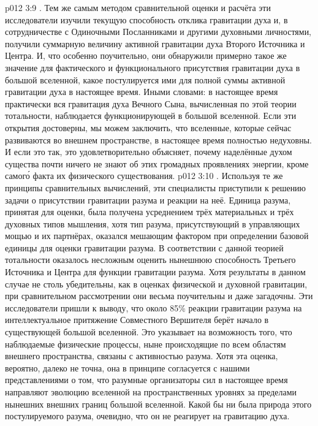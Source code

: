 \vs p012 3:9 . Тем же самым методом сравнительной оценки и расчёта эти исследователи изучили текущую способность отклика гравитации духа и, в сотрудничестве с Одиночными Посланниками и другими духовными личностями, получили суммарную величину активной гравитации духа Второго Источника и Центра. И, что особенно поучительно, они обнаружили примерно такое же значение для фактического и функционального присутствия гравитации духа в большой вселенной, какое постулируется ими для полной суммы активной гравитации духа в настоящее время. Иными словами: в настоящее время практически вся гравитация духа Вечного Сына, вычисленная по этой теории тотальности, наблюдается функционирующей в большой вселенной. Если эти открытия достоверны, мы можем заключить, что вселенные, которые сейчас развиваются во внешнем пространстве, в настоящее время полностью недуховны. И если это так, это удовлетворительно объясняет, почему наделённые духом существа почти ничего не знают об этих громадных проявлениях энергии, кроме самог\'о факта их физического существования.
\vs p012 3:10 . Используя те же принципы сравнительных вычислений, эти специалисты приступили к решению задачи о присутствии гравитации разума и реакции на неё. Единица разума, принятая для оценки, была получена усреднением трёх материальных и трёх духовных типов мышления, хотя тип разума, присутствующий в управляющих мощью и их партнёрах, оказался мешающим фактором при определении базовой единицы для оценки гравитации разума. В соответствии с данной теорией тотальности оказалось несложным оценить нынешнюю способность Третьего Источника и Центра для функции гравитации разума. Хотя результаты в данном случае не столь убедительны, как в оценках физической и духовной гравитации, при сравнительном рассмотрении они весьма поучительны и даже загадочны. Эти исследователи пришли к выводу, что около 85\% реакции гравитации разума на интеллектуальное притяжение Совместного Вершителя берёт начало в существующей большой вселенной. Это указывает на возможность того, что наблюдаемые физические процессы, ныне происходящие по всем областям внешнего пространства, связаны с активностью разума. Хотя эта оценка, вероятно, далеко не точна, она в принципе согласуется с нашими представлениями о том, что разумные организаторы сил в настоящее время направляют эволюцию вселенной на пространственных уровнях за пределами нынешних внешних границ большой вселенной. Какой бы ни была природа этого постулируемого разума, очевидно, что он не реагирует на гравитацию духа.
